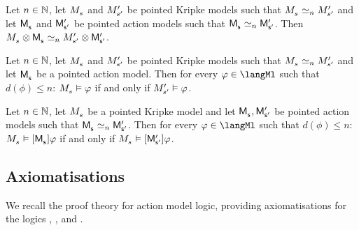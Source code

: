 \begin{proposition}
Let $n \in \mathbb{N}$,
let $\kPModel{\kStateS}$ and ${M^{\prime}_{{s}^{\prime}}}$ be pointed Kripke models such that $\kPModel{\kStateS} \bisimilar[n] \kPModelP{\kStateSP}$ and
let $\aPModel{\aStateS}$ and ${\mathsf{M}^{\prime}_{{\mathsf{{s}}^{\prime}}}}$ be pointed action models such that $\aPModel{\aStateS} \bisimilar[n] \aPModelP{\aStateSP}$.
Then $\kPModel{\kStateS} \exec \aPModel{\aStateS} \bisimilar[n] \kPModelP{\kStateSP} \exec \aPModelP{\aStateSP}$.
\end{proposition}

\begin{proposition}
Let $n \in \mathbb{N}$,
let $\kPModel{\kStateS}$ and ${M^{\prime}_{{s}^{\prime}}}$ be pointed Kripke models such that $\kPModel{\kStateS} \bisimilar[n] \kPModelP{\kStateSP}$ and
let $\aPModel{\aStateS}$ be a pointed action model.
Then for every $\phi \in \langMl$ such that $d(\phi) \leq n$: $\kPModel{\kStateS} \entails \phi$ if and only if ${M^{\prime}_{{s}^{\prime}}} \vDash \varphi$.
\end{proposition}

\begin{proposition}
Let $n \in \mathbb{N}$,
let $\kPModel{\kStateS}$ be a pointed Kripke model and
let $\aPModel{\aStateS}, \aPModelP{\aStateSP}$ be pointed action models such that $\aPModel{\aStateS} \bisimilar[n] \aPModelP{\aStateSP}$.
Then for every $\phi \in \langMl$ such that $d(\phi) \leq n$: $\kPModel{\kStateS} \entails \actionA{\aPModel{\aStateS}} \phi$ if and only if $\kPModel{\kStateS} \entails \actionA{\aPModelP{\aStateSP}} \phi$.
\end{proposition}

\subsection{Axiomatisations}

We recall the proof theory for action model logic, providing axiomatisations for the logics \logicAmlK{}, \logicAmlKFF{}, and \logicAmlS{}.

